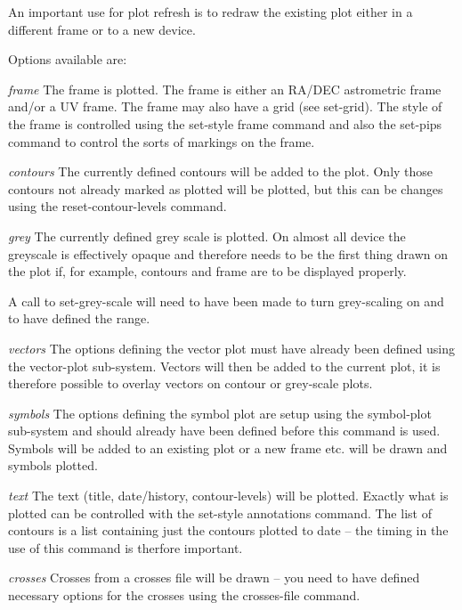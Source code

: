 An important use for plot refresh is to redraw the existing plot
either in a different frame or to a new device.

Options available are:

{\em frame}
\newline
The frame is plotted. The frame is either an RA/DEC astrometric frame
and/or a UV frame.  The frame may also have a grid (see set-grid).  The
style of the frame is controlled using the set-style frame command
and also the set-pips command to control the sorts of markings on
the frame.

{\em contours}
\newline
The currently defined contours will be added to the plot.  Only those
contours not already marked as plotted will be plotted, but this can
be changes using the reset-contour-levels command.


{\em grey}
\newline
The currently defined grey scale is plotted.  On almost all device the
greyscale is effectively opaque and therefore needs to be the first
thing drawn on the plot if, for example, contours and frame are to
be displayed properly.

A call to set-grey-scale will need to have been made to turn grey-scaling
on and to have defined the range.

{\em vectors}
\newline
The options defining the vector plot must have already been defined
using the vector-plot sub-system.  Vectors will then be added to the
current plot, it is therefore possible to overlay vectors on contour
or grey-scale plots.

{\em symbols}
\newline
The options defining the symbol plot are setup using the symbol-plot
sub-system and should already have been defined before this command is
used.  Symbols will be added to an existing plot or a new frame etc.
will be drawn and symbols plotted.

{\em text}
\newline
The text (title, date/history, contour-levels) will be plotted. Exactly
what is plotted can be controlled with the set-style annotations command.
The list of contours is a list containing just the contours plotted to
date -- the timing in the use of this command is therfore important.

{\em crosses}
\newline
Crosses from a crosses file will be drawn -- you need to have defined
necessary options for the crosses using the crosses-file command.

